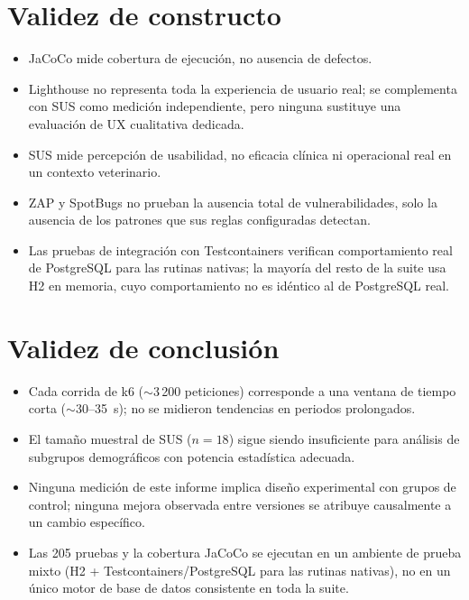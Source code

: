 \section{Validez de constructo}

\begin{itemize}[nosep]
  \item JaCoCo mide cobertura de ejecuci\'on, no ausencia de defectos.
  \item Lighthouse no representa toda la experiencia de usuario real; se
    complementa con SUS como medici\'on independiente, pero ninguna
    sustituye una evaluaci\'on de UX cualitativa dedicada.
  \item SUS mide percepci\'on de usabilidad, no eficacia cl\'inica ni
    operacional real en un contexto veterinario.
  \item ZAP y SpotBugs no prueban la ausencia total de vulnerabilidades,
    solo la ausencia de los patrones que sus reglas configuradas detectan.
  \item Las pruebas de integraci\'on con Testcontainers verifican
    comportamiento real de PostgreSQL para las rutinas nativas; la mayor\'ia
    del resto de la suite usa H2 en memoria, cuyo comportamiento no es
    id\'entico al de PostgreSQL real.
\end{itemize}

\section{Validez de conclusi\'on}

\begin{itemize}[nosep]
  \item Cada corrida de k6 ($\sim$3\,200 peticiones) corresponde a una
    ventana de tiempo corta ($\sim$30--35~s); no se midieron tendencias en
    periodos prolongados.
  \item El tama\~no muestral de SUS ($n=18$) sigue siendo insuficiente para
    an\'alisis de subgrupos demogr\'aficos con potencia estad\'istica
    adecuada.
  \item Ninguna medici\'on de este informe implica dise\~no experimental
    con grupos de control; ninguna mejora observada entre versiones se
    atribuye causalmente a un cambio espec\'ifico.
  \item Las 205 pruebas y la cobertura JaCoCo se ejecutan en un ambiente
    de prueba mixto (H2 + Testcontainers/PostgreSQL para las rutinas
    nativas), no en un \'unico motor de base de datos consistente en toda
    la suite.
\end{itemize}

